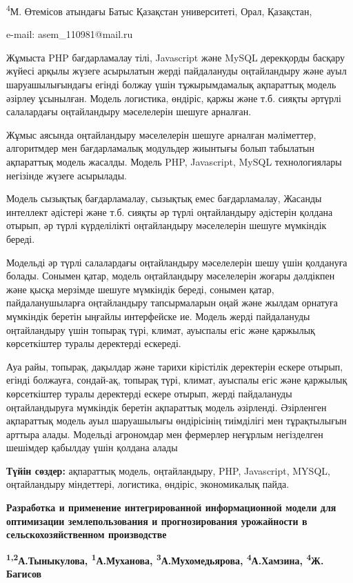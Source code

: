\textsuperscript{4}М. Өтемісов атындағы Батыс Қазақстан университеті,
Орал, Қазақстан,

e-mail: asem\_110981@mail.ru

Жұмыста PHP бағдарламалау тілі, Javascript және MySQL дерекқорды басқару
жүйесі арқылы жүзеге асырылатын жерді пайдалануды оңтайландыру және ауыл
шаруашылығындағы егінді болжау үшін тұжырымдамалық ақпараттық модель
әзірлеу ұсынылған. Модель логистика, өндіріс, қаржы және т.б. сияқты
әртүрлі салалардағы оңтайландыру мәселелерін шешуге арналған.

Жұмыс аясында оңтайландыру мәселелерін шешуге арналған мәліметтер,
алгоритмдер мен бағдарламалық модульдер жиынтығы болып табылатын
ақпараттық модель жасалды. Модель PHP, Javascript, MySQL технологиялары
негізінде жүзеге асырылады.

Модель сызықтық бағдарламалау, сызықтық емес бағдарламалау, Жасанды
интеллект әдістері және т.б. сияқты әр түрлі оңтайландыру әдістерін
қолдана отырып, әр түрлі күрделілікті оңтайландыру мәселелерін шешуге
мүмкіндік береді.

Модельді әр түрлі салалардағы оңтайландыру мәселелерін шешу үшін
қолдануға болады. Сонымен қатар, модель оңтайландыру мәселелерін жоғары
дәлдікпен және қысқа мерзімде шешуге мүмкіндік береді, сонымен қатар,
пайдаланушыларға оңтайландыру тапсырмаларын оңай және жылдам орнатуға
мүмкіндік беретін ыңғайлы интерфейске ие. Модель жерді пайдалануды
оңтайландыру үшін топырақ түрі, климат, ауыспалы егіс және қаржылық
көрсеткіштер туралы деректерді ескереді.

Ауа райы, топырақ, дақылдар және тарихи кірістілік деректерін ескере
отырып, егінді болжауға, сондай-ақ, топырақ түрі, климат, ауыспалы егіс
және қаржылық көрсеткіштер туралы деректерді ескере отырып, жерді
пайдалануды оңтайландыруға мүмкіндік беретін ақпараттық модель
әзірленді. Әзірленген ақпараттық модель ауыл шаруашылығы өндірісінің
тиімділігі мен тұрақтылығын арттыра алады. Модельді агрономдар мен
фермерлер неғұрлым негізделген шешімдер қабылдау үшін қолдана алады

\textbf{Түйін сөздер:} ақпараттық модель, оңтайландыру, PHP, Javascript,
MYSQL, оңтайландыру міндеттері, логистика, өндіріс, экономикалық пайда.

\textbf{Разработка и применение интегрированной информационной модели
для оптимизации землепользования и прогнозирования урожайности в
сельскохозяйственном производстве}

\textbf{\textsuperscript{1,2}А.Тыныкулова,
\textsuperscript{1}А.Муханова, \textsuperscript{3}А.Мухомедьярова,
\textsuperscript{4}А.Хамзина, \textsuperscript{4}Ж. Багисов}

